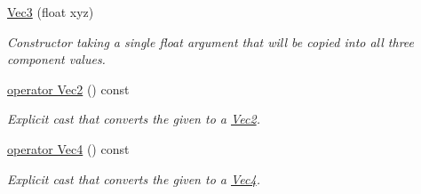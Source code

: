 \begin{DoxyCompactItemize}
\hyperlink{classgfxmath_1_1_vec3_aa9067613452e593627e33477cd4b63a3}{Vec3} (float xyz)
\begin{DoxyCompactList}\small\item\em Constructor taking a single float argument that will be copied into all three component values. \end{DoxyCompactList}\item 
\hyperlink{classgfxmath_1_1_vec3_a75e16fdee00a8ad1c6bb3e8d129bf9a5}{operator Vec2} () const 
\begin{DoxyCompactList}\small\item\em Explicit cast that converts the given to a \hyperlink{classgfxmath_1_1_vec2}{Vec2}. \end{DoxyCompactList}\item 
\hyperlink{classgfxmath_1_1_vec3_a63202163a9e528a6bd3a432b3b4ca686}{operator Vec4} () const 
\begin{DoxyCompactList}\small\item\em Explicit cast that converts the given to a \hyperlink{classgfxmath_1_1_vec4}{Vec4}. \end{DoxyCompactList}\end{DoxyCompactItemize}
